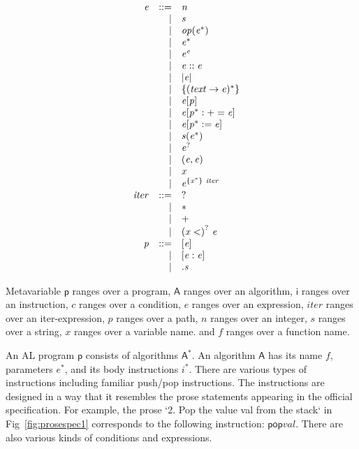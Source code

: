 \begin{minipage}{0.5\textwidth}
$$
\begin{array}{@{}lrrl@{}}
& \mathit{e} &::=& \mathit{n} \\ &&|&
\mathit{s} \\ &&|&
\mathit{op}(\mathit{e^\ast}) \\ &&|&
\mathit{e}^\ast \\ &&|&
\mathit{e}^\mathit{e} \\ &&|&
\mathit{e}::\mathit{e} \\ &&|&
|\mathit{e}| \\ &&|&
\{{(\mathit{text} \rightarrow \mathit{e})^\ast}\} \\ &&|&
\mathit{e}[\mathit{p}] \\ &&|&
\mathit{e}[\mathit{p}^\ast:+=\mathit{e}] \\ &&|&
\mathit{e}[\mathit{p}^\ast:=\mathit{e}] \\ &&|&
\mathit{s}(\mathit{e}^\ast) \\ &&|&
\mathit{e}^? \\ &&|&
(\mathit{e},\mathit{e}) \\ &&|&
\mathit{x} \\ &&|&
\mathit{e}^{\{\mathit{x}^\ast\}~\mathit{iter}} \\
& \mathit{iter} &::=& \mathsf{?} \\ &&|&
\mathsf{\ast} \\ &&|&
\mathsf{+} \\ &&|&
{(\mathit{x}<)}^?~\mathit{e} \\
& \mathit{p} &::=& [\mathit{e}] \\ &&|&
[\mathit{e}:\mathit{e}] \\ &&|&
.\mathit{s} \\
\end{array}
$$
\end{minipage}

Metavariable
$\mathsf{p}$ ranges over a program,
$\mathsf{A}$ ranges over an algorithm,
$\mathsf{i}$ ranges over an instruction,
$\mathit{c}$ ranges over a condition,
$\mathit{e}$ ranges over an expression,
$\mathit{iter}$ ranges over an iter-expression,
$\mathit{p}$ ranges over a path,
$\mathit{n}$ ranges over an integer,
$\mathit{s}$ ranges over a string,
$\mathit{x}$ ranges over a variable name.
and
$\mathit{f}$ ranges over a function name.

An AL program $\mathsf{p}$ consists of algorithms $\mathsf{A}^\ast$.  An
algorithm $\mathsf{A}$ has its name $\mathit{f}$, parameters
${\mathit{e}^\ast}$, and its body instructions ${\mathit{i}^\ast}$.  There are
various types of instructions including familiar push/pop instructions. The
instructions are designed in a way that it resembles the prose statements
appearing in the official specification.  For example, the prose `2. Pop the
value val from the stack` in Fig~\ref{fig:prosespec1} corresponds to the following
instruction: $\mathsf{pop} \mathit{val}$. There are also various kinds of
conditions and expressions.
